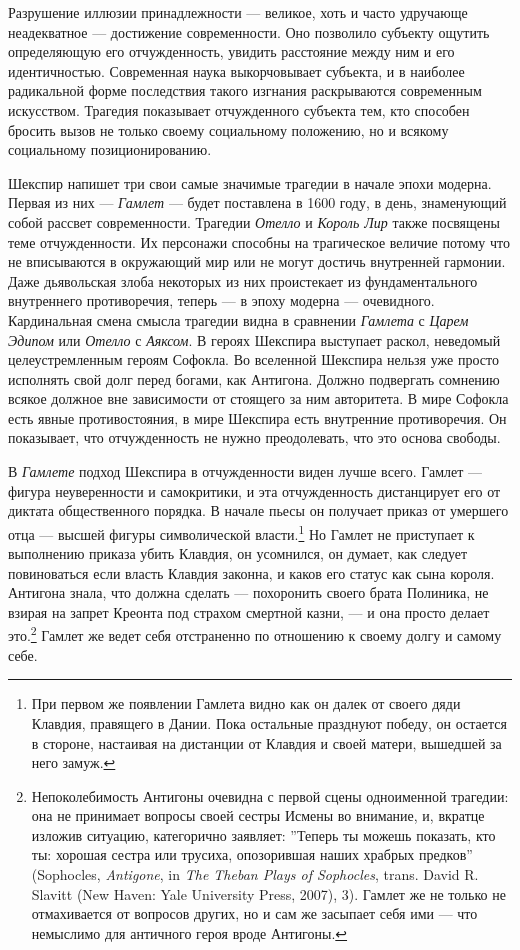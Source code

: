 \documentclass[12pt]{book}
\begin{document}
Разрушение иллюзии принадлежности --- великое, хоть и часто удручающе неадекватное --- достижение современности. Оно позволило субъекту ощутить определяющую его отчужденность, увидить расстояние между ним и его идентичностью. Современная наука выкорчовывает субъекта, и в наиболее радикальной форме последствия такого изгнания раскрываются современным искусством. Трагедия показывает отчужденного субъекта тем, кто способен бросить вызов не только своему социальному положению, но и всякому социальному позиционированию.

Шекспир напишет три свои самые значимые трагедии в начале эпохи модерна. Первая из них --- \textit{Гамлет} --- будет поставлена в 1600 году, в день, знаменующий собой рассвет современности. Трагедии \textit{Отелло} и \textit{Король Лир} также посвящены теме отчужденности. Их персонажи способны на трагическое величие потому что не вписываются в окружающий мир или не могут достичь внутренней гармонии. Даже дьявольская злоба некоторых из них проистекает из фундаментального внутреннего противоречия, теперь --- в эпоху модерна --- очевидного. Кардинальная смена смысла трагедии видна в сравнении \textit{Гамлета} с \textit{Царем Эдипом} или \textit{Отелло} с \textit{Аяксом}. В героях Шекспира выступает раскол, неведомый целеустремленным героям Софокла. Во вселенной Шекспира нельзя уже просто исполнять свой долг перед богами, как Антигона. Должно подвергать сомнению всякое должное вне зависимости от стоящего за ним авторитета. В мире Софокла есть явные противостояния, в мире Шекспира есть внутренние противоречия. Он показывает, что отчужденность не нужно преодолевать, что это основа свободы.

В \textit{Гамлете} подход Шекспира в отчужденности виден лучше всего. Гамлет --- фигура неуверенности и самокритики, и эта отчужденность дистанцирует его от диктата общественного порядка. В начале пьесы он получает приказ от умершего отца --- высшей фигуры символической власти.\footnote{При первом же появлении Гамлета видно как он далек от своего дяди Клавдия, правящего в Дании. Пока остальные празднуют победу, он остается в стороне, настаивая на дистанции от Клавдия и своей матери, вышедшей за него замуж.} Но Гамлет не приступает к выполнению приказа убить Клавдия, он усомнился, он думает, как следует повиноваться если власть Клавдия законна, и каков его статус как сына короля. Антигона знала, что должна сделать --- похоронить своего брата Полиника, не взирая на запрет Креонта под страхом смертной казни, --- и она просто делает это.\footnote{Непоколебимость Антигоны очевидна с первой сцены одноименной трагедии: она не принимает вопросы своей сестры Исмены во внимание, и, вкратце изложив ситуацию, категорично заявляет: ''Теперь ты можешь показать, кто ты: хорошая сестра или трусиха, опозорившая наших храбрых предков'' (Sophocles, \textit{Antigone}, in \textit{The Theban Plays of Sophocles}, trans. David R. Slavitt (New Haven: Yale University Press, 2007), 3). Гамлет же не только не отмахивается от вопросов других, но и сам же засыпает себя ими --- что немыслимо для античного героя вроде Антигоны.} Гамлет же ведет себя отстраненно по отношению к своему долгу и самому себе.
\end{document}
